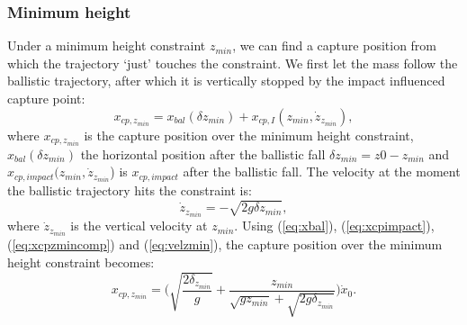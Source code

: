 \documentclass[letterpaper, 10 pt, conference]{ieeeconf}  %
\newcommand{\zmin}{z_{min}}
\begin{document}
\subsubsection{Minimum height} Under a minimum height constraint $\zmin$, we can find a capture position from which the trajectory `just' touches the constraint. We first let the mass follow the ballistic trajectory, after which it is vertically stopped by the impact influenced capture point:
\begin{equation}
	x_{cp,\zmin} = x_{bal}(\delta \zmin) + x_{cp,I}(\zmin, \dot{z}_{\zmin}),
	\label{eq:xcpzmincomp}
\end{equation}
where $x_{cp,\zmin}$ is the capture position over the minimum height constraint, $x_{bal}(\delta \zmin)$ the horizontal position after the ballistic fall $\delta \zmin = z0-\zmin$ and $x_{cp,impact}(\zmin,\dot{z}_{\zmin}$) is $x_{cp,impact}$ after the ballistic fall. The velocity at the moment the ballistic trajectory hits the constraint is:
\begin{equation}
	\dot{z}_{\zmin} = -\sqrt{2g\delta \zmin},
	\label{eq:velzmin}
\end{equation}
where $\dot{z}_{\zmin}$ is the vertical velocity at $z_{min}$. Using (\ref{eq:xbal}), (\ref{eq:xcpimpact}), (\ref{eq:xcpzmincomp}) and (\ref{eq:velzmin}), the capture position over the minimum height constraint becomes:
\begin{equation}
	x_{cp,\zmin} = \Bigg(\sqrt{\frac{2\delta_{z_{min}}}{g}} + \frac{\zmin}{\sqrt{g \zmin}+\sqrt{2g\delta_{\zmin}}}\Bigg)\dot{x}_0.
\end{equation}
\end{document}
